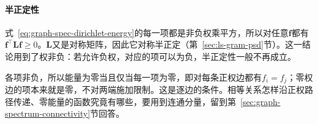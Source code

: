 \paragraph{半正定性}
式~\eqref{eq:graph-spec-dirichlet-energy}的每一项都是非负权乘平方，所以对任意$\bm f$都有$\bm f^{\top}\bm L\bm f\geq0$。$\bm L$又是对称矩阵，因此它对称半正定（第~\ref{sec:ls-gram-psd}节）。这一结论用到了权非负：若允许负权，对应的项可以为负，半正定性一般不再成立。

各项非负，所以能量为零当且仅当每一项为零，即对每条正权边都有$f_i=f_j$；零权边的项本来就是零，不对两端施加限制。这是逐边的条件。相等关系怎样沿正权路径传递、零能量的函数究竟有哪些，要用到连通分量，留到第~\ref{sec:graph-spectrum-connectivity}节回答。
